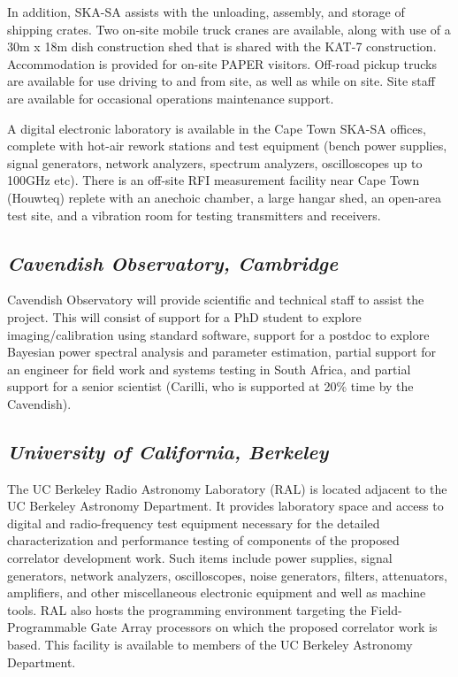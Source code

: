 \documentclass[11pt]{article}
\begin{document}
In addition, SKA-SA assists with the unloading, assembly, and storage of
shipping crates. Two on-site mobile truck cranes are available, along with use
of a 30m x 18m dish construction shed that is shared with the KAT-7 construction.
Accommodation is provided for on-site PAPER visitors. Off-road pickup trucks
are available for use driving to and from site, as well as while on site.  Site staff are available for
occasional operations maintenance support.

A digital electronic laboratory is available in the Cape Town SKA-SA offices,
complete with hot-air rework stations and test equipment (bench
power supplies, signal generators, network analyzers, spectrum analyzers,
oscilloscopes up to 100GHz etc). There is an off-site RFI measurement facility
near Cape Town (Houwteq) replete with 
an anechoic
chamber, a large hangar shed, an open-area test site, and a vibration room for testing
transmitters and receivers.

\subsection*{\it Cavendish Observatory, Cambridge}

Cavendish Observatory will provide scientific and technical staff to assist the project.  This will consist of
support for a PhD student to explore imaging/calibration using standard software,
support for a postdoc to explore Bayesian power spectral analysis and parameter estimation,
partial support for an engineer for field work and systems testing in South Africa,
and partial support for a senior scientist (Carilli, who is supported at 20\% time by the Cavendish).

\subsection*{\it University of California, Berkeley}

The UC Berkeley Radio Astronomy Laboratory (RAL) is located adjacent to the UC
Berkeley Astronomy Department. It provides laboratory space and access to
digital and radio-frequency test equipment necessary for the detailed
characterization and performance testing of components of the proposed correlator
development work. Such items include power supplies, signal generators, network
analyzers, oscilloscopes, noise generators, filters, attenuators, amplifiers,
and other miscellaneous electronic equipment and well as machine tools. RAL also hosts the programming
environment targeting the Field-Programmable Gate Array processors on which the
proposed correlator work is based. This facility is available to members of the
UC Berkeley Astronomy Department.
\end{document}

